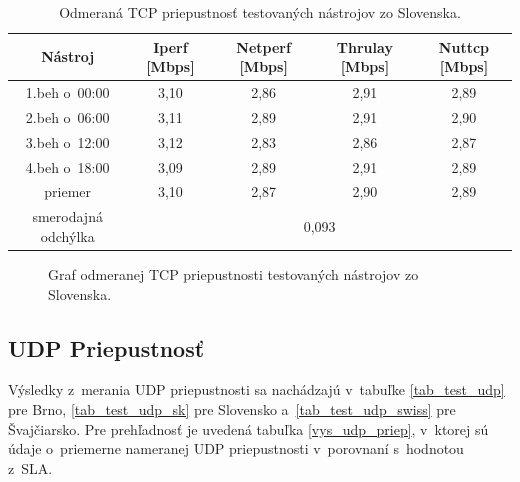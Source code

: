     \begin{table}[h!]
        \begin{center}
            \begin{tabular}{|c|c|c|c|c|}
                \hline
            Nástroj & Iperf [Mbps]& Netperf [Mbps]& Thrulay [Mbps]& Nuttcp [Mbps]\\ 
                \hline
                1.beh o~00:00 & 3,10 & 2,86 & 2,91 & 2,89 \\
                \hline
                2.beh o~06:00 & 3,11 & 2,89 & 2,91 & 2,90 \\
                \hline
                3.beh o~12:00 & 3,12 & 2,83 & 2,86 & 2,87 \\
                \hline
                4.beh o~18:00 & 3,09 & 2,89 & 2,91 & 2,89 \\
                \hline
                priemer       & 3,10 & 2,87 & 2,90 & 2,89 \\
                \hline
                smerodajná odchýlka & \multicolumn{4}{c|}{0,093}\\
                \hline
            \end{tabular}
            \caption{Odmeraná TCP priepustnosť testovaných nástrojov zo
                Slovenska.} 
            \label{tab_test_tcp_sk}
        \end{center}
    \end{table}
   \begin{figure}[H]
       \begin{center}
               \caption{Graf odmeranej TCP priepustnosti testovaných nástrojov
               zo Slovenska.}
           \label{tab_test_tcp_sk_graf}
       \end{center}
   \end{figure}

        \subsection{UDP Priepustnosť} \label{test_vys_udp}
        Výsledky z~merania UDP priepustnosti sa nachádzajú v~tabuľke
        \ref{tab_test_udp} pre Brno, \ref{tab_test_udp_sk} pre Slovensko
        a~\ref{tab_test_udp_swiss} pre Švajčiarsko. Pre prehľadnosť je uvedená
        tabuľka \ref{vys_udp_priep}, v~ktorej sú údaje o~priemerne nameranej UDP 
        priepustnosti v~porovnaní s~hodnotou z~SLA. 

